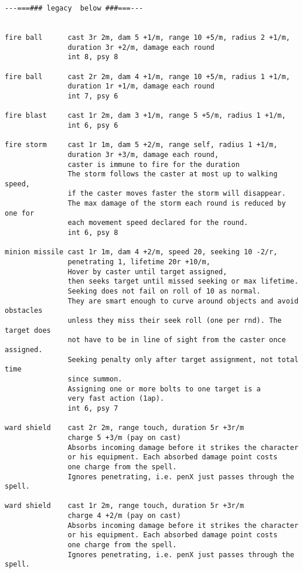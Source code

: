 \small \begin{verbatim}
---===### legacy  below ###===---


fire ball      cast 3r 2m, dam 5 +1/m, range 10 +5/m, radius 2 +1/m,
               duration 3r +2/m, damage each round
               int 8, psy 8

fire ball      cast 2r 2m, dam 4 +1/m, range 10 +5/m, radius 1 +1/m,
               duration 1r +1/m, damage each round
               int 7, psy 6

fire blast     cast 1r 2m, dam 3 +1/m, range 5 +5/m, radius 1 +1/m,
               int 6, psy 6

fire storm     cast 1r 1m, dam 5 +2/m, range self, radius 1 +1/m,
               duration 3r +3/m, damage each round,
               caster is immune to fire for the duration
               The storm follows the caster at most up to walking speed,
               if the caster moves faster the storm will disappear.
               The max damage of the storm each round is reduced by one for
               each movement speed declared for the round.
               int 6, psy 8

minion missile cast 1r 1m, dam 4 +2/m, speed 20, seeking 10 -2/r,
               penetrating 1, lifetime 20r +10/m,
               Hover by caster until target assigned,
               then seeks target until missed seeking or max lifetime.
               Seeking does not fail on roll of 10 as normal.
               They are smart enough to curve around objects and avoid obstacles
               unless they miss their seek roll (one per rnd). The target does
               not have to be in line of sight from the caster once assigned.
               Seeking penalty only after target assignment, not total time
               since summon.
               Assigning one or more bolts to one target is a
               very fast action (1ap).
               int 6, psy 7

ward shield    cast 2r 2m, range touch, duration 5r +3r/m
               charge 5 +3/m (pay on cast)
               Absorbs incoming damage before it strikes the character
               or his equipment. Each absorbed damage point costs
               one charge from the spell.
               Ignores penetrating, i.e. penX just passes through the spell.

ward shield    cast 1r 2m, range touch, duration 5r +3r/m
               charge 4 +2/m (pay on cast)
               Absorbs incoming damage before it strikes the character
               or his equipment. Each absorbed damage point costs
               one charge from the spell.
               Ignores penetrating, i.e. penX just passes through the spell.


\end{verbatim}
